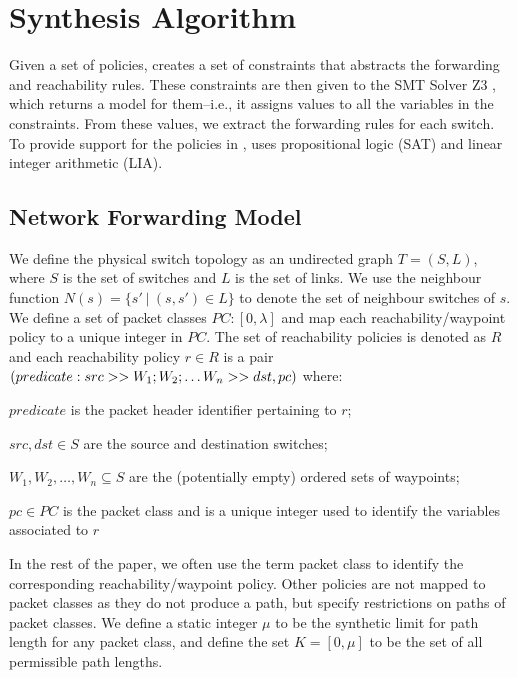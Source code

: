 \section{Synthesis Algorithm}
Given a set of policies, \Name creates a set of constraints 
that abstracts the forwarding and reachability rules. 
These constraints are then given to the SMT Solver Z3 \cite{z3}, which returns a model 
for them--i.e., it assigns values to all the variables in the constraints. From these values, we extract the forwarding rules for each switch.
To provide support for the policies in , \name uses propositional logic (SAT) and linear integer arithmetic (LIA).
\subsection{Network Forwarding Model} \label{sec:fwdmodel}
We define the physical switch topology as an undirected graph $T=(S, L)$,
where $S$ is the set of switches and $L$ is the set of links. 
We use the neighbour function $N(s) = \{s'\ | \ (s,s') \in L \}$ to denote 
the set of neighbour switches of $s$. 
We define a set of packet classes $PC : [0,\lambda]$ and map each reachability/waypoint policy to a unique integer in $PC$.
The set of reachability policies is denoted as $R$ and each reachability policy $r \in R$ is
a pair
$(predicate :\newline src >> W_1;W_2; \ldots W_n >> dst, pc)$
where:
\begin{compactitemize}
\item  $predicate$ is the packet header identifier pertaining to $r$;
\item  $src,dst \in S$ are the source and destination switches;
\item $W_1, W_2, \ldots, W_n \subseteq S$ are the (potentially empty) ordered sets of waypoints; 
\item $pc \in PC$ is the packet class and is a unique integer used to identify the variables associated to $r$
\end{compactitemize} 
In the rest of the paper, we often use the term packet class to identify the corresponding reachability/waypoint policy. 
Other policies are not mapped to packet classes as they do not produce a path, but specify restrictions on paths of packet classes. 
We define a static integer $\mu$ to be the synthetic limit for path length for any packet class, and define the set $K = [0, \mu]$ to be the set of all permissible path lengths.

